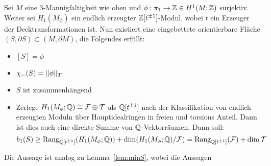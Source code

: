     \begin{prop}
        Sei $M$ eine 3-Mannigfaltigkeit wie oben und $\phi: \pi_1 \to \mathbb{Z} \in H^1(M;\mathbb{Z})$ surjektiv. Weiter sei $H_1(M_\phi)$ ein endlich erzeugter $\mathbb{Z}[t^{\pm 1}]$-Modul, wobei $t$ ein Erzeuger der Decktransformationen ist. Nun existiert eine eingebettete orientierbare Fläche $(S,\partial S) \subset (M,\partial M)$, die Folgendes erfüllt:
        \begin{itemize}
            \item $[S]=\phi$
            \item $\chi_-(S) = ||\phi||_T$
            \item $S$ ist zusammenhängend
            \item Zerlege $H_1(M_\phi;\mathbb{Q})\cong \mathcal{F} \oplus \mathcal{T}$ als $\mathbb{Q}[t^{\pm 1}]$ nach der Klassifikation von endlich erzeugten Moduln über Hauptidealringen in freien und torsions Anteil. Dann ist dies auch eine direkte Summe von $\mathbb{Q}$-Vektorräumen. Dann soll:
            \[
                b_1(S) \geq  \operatorname{Rang}_{\mathbb{Q}[t^{\pm 1}]}(H_1(M_\phi;\mathbb{Q})) + \dim(H_1(M_\phi;\mathbb{Q})/\mathcal F) = \operatorname{Rang}_{\mathbb{Q}[t^{\pm 1}]} (\mathcal F) + \dim \mathcal T
            \]
        \end{itemize}
    \end{prop} 
    \begin{bem}
        Die Aussage ist analog zu Lemma~\ref{lem:minS}, wobei die Aussagen 
    \end{bem}
